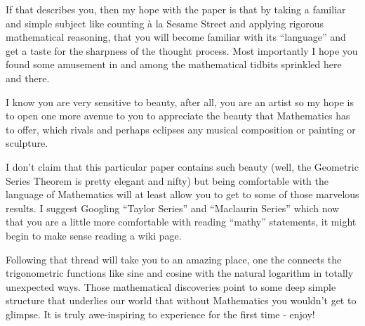 \documentclass{article}
\begin{document}
If that describes you, then
my hope with the paper is that by
taking a familiar and simple subject like counting \`a la Sesame Street and applying rigorous mathematical reasoning,
that you will become familiar with its ``language'' and get a taste for the
sharpness of the thought process. Most importantly I hope
you found some amusement in and among the mathematical tidbits sprinkled here
and there.

I know you are very sensitive to beauty, after all, you are an artist
so my hope is to open one more avenue to you to appreciate 
the beauty that Mathematics has to offer, which rivals and perhaps eclipses any
musical composition or painting or sculpture.

I don't claim that this particular paper contains such beauty (well, the Geometric Series Theorem is pretty
elegant and nifty) but being comfortable with the language of Mathematics will at least allow
you to get to some of those marvelous results. I suggest Googling ``Taylor Series'' and ``Maclaurin Series''
which now that you are a little more comfortable with reading ``mathy'' statements, it might
begin to make sense reading a wiki page.

Following that thread will take you to an amazing place, one the connects the trigonometric functions
like sine and cosine with the natural logarithm in totally unexpected ways. Those mathematical
discoveries point to some deep simple structure that underlies our world that without Mathematics
you wouldn't get to glimpse. It is truly awe-inspiring to experience for the first time - enjoy!
\end{document}
